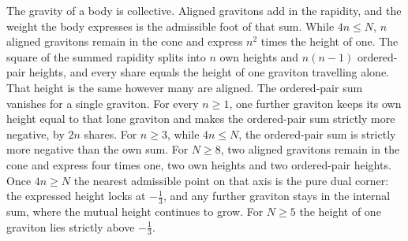 \documentclass[a4paper]{article}
\begin{document}
The gravity of a body is collective. Aligned gravitons add in the rapidity, and the weight the body expresses is the admissible foot of that sum. While \(4n\le N\), \(n\) aligned gravitons remain in the cone and express \(n^2\) times the height of one. The square of the summed rapidity splits into \(n\) own heights and \(n(n-1)\) ordered-pair heights, and every share equals the height of one graviton travelling alone. That height is the same however many are aligned. The ordered-pair sum vanishes for a single graviton. For every \(n\ge 1\), one further graviton keeps its own height equal to that lone graviton and makes the ordered-pair sum strictly more negative, by \(2n\) shares. For \(n\ge 3\), while \(4n\le N\), the ordered-pair sum is strictly more negative than the own sum. For \(N\ge 8\), two aligned gravitons remain in the cone and express four times one, two own heights and two ordered-pair heights. Once \(4n\ge N\) the nearest admissible point on that axis is the pure dual corner: the expressed height locks at \(-\frac13\), and any further graviton stays in the internal sum, where the mutual height continues to grow. For \(N\ge 5\) the height of one graviton lies strictly above \(-\frac13\).
\end{document}
